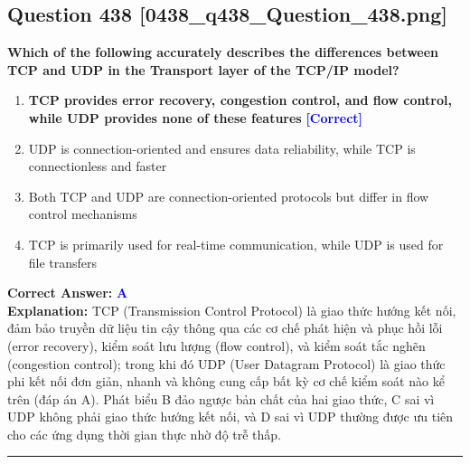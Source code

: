 \documentclass[11pt,a4paper]{article}
\begin{document}
\begin{minipage}{\textwidth}
\subsection*{Question 438 \quad \footnotesize{[0438\_q438\_Question\_438.png]}}
\noindent \textbf{Which of the following accurately describes the differences between TCP and UDP in the Transport layer of the TCP/IP model?}

\begin{enumerate}[label=\Alph*.]
    \item \textbf{TCP provides error recovery, congestion control, and flow control, while UDP provides none of these features} \hfill \textcolor{blue}{\textbf{[Correct]}}
    \item UDP is connection-oriented and ensures data reliability, while TCP is connectionless and faster
    \item Both TCP and UDP are connection-oriented protocols but differ in flow control mechanisms
    \item TCP is primarily used for real-time communication, while UDP is used for file transfers
\end{enumerate}

\noindent \textbf{Correct Answer:} \textcolor{blue}{\textbf{A}} \\[2pt]
\noindent \textbf{Explanation:} TCP (Transmission Control Protocol) là giao thức hướng kết nối, đảm bảo truyền dữ liệu tin cậy thông qua các cơ chế phát hiện và phục hồi lỗi (error recovery), kiểm soát lưu lượng (flow control), và kiểm soát tắc nghẽn (congestion control); trong khi đó UDP (User Datagram Protocol) là giao thức phi kết nối đơn giản, nhanh và không cung cấp bất kỳ cơ chế kiểm soát nào kể trên (đáp án A). Phát biểu B đảo ngược bản chất của hai giao thức, C sai vì UDP không phải giao thức hướng kết nối, và D sai vì UDP thường được ưu tiên cho các ứng dụng thời gian thực nhờ độ trễ thấp.

\par\vspace{0.3cm}
\hrule
\vspace{0.3cm}
\end{minipage}
\end{document}
